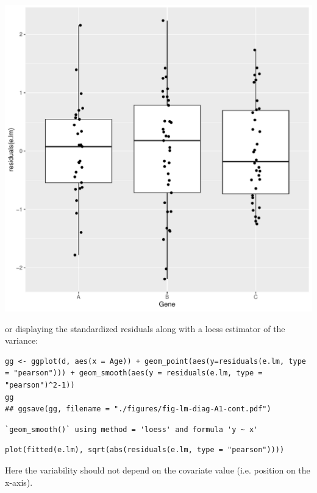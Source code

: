 \documentclass{article}
\begin{document}
\begin{center}
\includegraphics[width=1\textwidth]{./figures/fig-lm-diag-A1-bin.pdf}
\end{center}
or displaying the standardized residuals along with a loess estimator
of the variance:
\lstset{language=r,label= ,caption= ,captionpos=b,numbers=none}
\begin{lstlisting}
gg <- ggplot(d, aes(x = Age)) + geom_point(aes(y=residuals(e.lm, type = "pearson"))) + geom_smooth(aes(y = residuals(e.lm, type = "pearson")^2-1))
gg
## ggsave(gg, filename = "./figures/fig-lm-diag-A1-cont.pdf")
\end{lstlisting}

\begin{verbatim}
`geom_smooth()` using method = 'loess' and formula 'y ~ x'
\end{verbatim}

\lstset{language=r,label= ,caption= ,captionpos=b,numbers=none}
\begin{lstlisting}
plot(fitted(e.lm), sqrt(abs(residuals(e.lm, type = "pearson"))))
\end{lstlisting}



Here the variability should not depend on the covariate value
(i.e. position on the x-axis).

\bigskip
\end{document}
